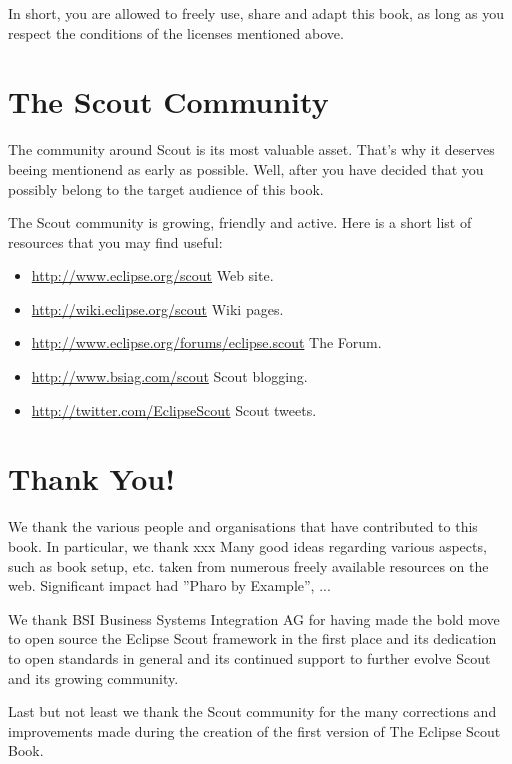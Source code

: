 \documentclass[a4paper,10pt,twoside]{book}
\begin{document}
In short, you are allowed to freely use, share and adapt this book, as long as you 
respect the conditions of the licenses mentioned above.


\section*{The Scout Community}

The community around Scout is its most valuable asset. That's why it deserves 
beeing mentionend as early as possible. Well, after you have decided that 
you possibly belong to the target audience of this book.

The Scout community is growing, friendly and active.
Here is a short list of resources that you may find useful:

\begin{itemize}
\item \url{http://www.eclipse.org/scout} Web site.
\item \url{http://wiki.eclipse.org/scout} Wiki pages.
\item \url{http://www.eclipse.org/forums/eclipse.scout} The Forum.
\item \url{http://www.bsiag.com/scout} Scout blogging.
\item \url{http://twitter.com/EclipseScout} Scout tweets.
\end{itemize}

\section*{Thank You!}

We thank the various people and organisations that have contributed 
to this book. In particular, we thank xxx
Many good ideas regarding various aspects, such as book setup, etc. taken from 
numerous freely available resources on the web. 
Significant impact had ''Pharo by Example'', ...

We thank BSI Business Systems Integration AG for having made the bold move 
to open source the Eclipse Scout framework in the first place and its 
dedication to open standards in general and its continued support to further
evolve Scout and its growing community.

Last but not least we thank the Scout community for the many corrections and improvements 
made during the creation of the first version of The Eclipse Scout Book.


\ifx\wholebook\relax\else
   
   
\end{document}
